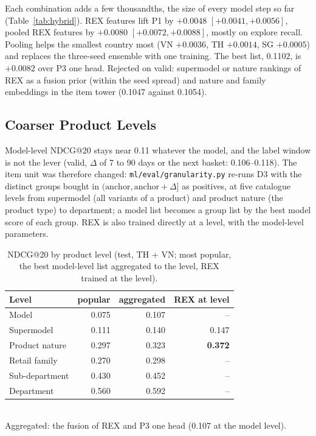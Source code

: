 \documentclass{ieeeaccess}
\begin{document}
Each combination adds a few thousandths, the size of every model step so far (Table~\ref{tab:hybrid}). REX features lift P1 by
$+0.0048$ $[+0.0041, +0.0056]$, pooled REX features by $+0.0080$ $[+0.0072, +0.0088]$, mostly on explore recall. Pooling helps the
smallest country most (VN $+0.0036$, TH $+0.0014$, SG $+0.0005$) and replaces the three-seed ensemble with one training. The best
list, 0.1102, is $+0.0082$ over P3 one head. Rejected on valid: supermodel or nature rankings of REX as a fusion prior (within the
seed spread) and nature and family embeddings in the item tower (0.1047 against 0.1054).

\subsection{Coarser Product Levels}
\label{sec:levels}
Model-level NDCG@20 stays near 0.11 whatever the model, and the label window is not the lever (valid, $\Delta$ of 7 to 90 days
or the next basket: 0.106--0.118). The item unit was therefore changed: \texttt{ml/eval/granularity.py} re-runs D3 with the
distinct groups bought in $(\text{anchor}, \text{anchor} + \Delta]$ as positives, at five catalogue levels from supermodel (all
variants of a product) and product nature (the product type) to department; a model list becomes a group list by the best model
score of each group. REX is also trained directly at a level, with the model-level parameters.

\begin{table}[t]
\caption{NDCG@20 by product level (test, TH + VN; most popular, the best model-level list aggregated to the level, REX trained at
the level).}
\label{tab:levels}
\setlength{\tabcolsep}{4pt}
\centering
\begin{tabular}{lrrr}
\toprule
Level & popular & aggregated & REX at level \\
\midrule
Model          & 0.075 & 0.107 & -- \\
Supermodel     & 0.111 & 0.140 & 0.147 \\
Product nature & 0.297 & 0.323 & \textbf{0.372} \\
Retail family  & 0.270 & 0.298 & -- \\
Sub-department & 0.430 & 0.452 & -- \\
Department     & 0.560 & 0.592 & -- \\
\bottomrule
\end{tabular}
\\[1ex]
{\footnotesize Aggregated: the fusion of REX and P3 one head (0.107 at the model level).}
\end{table}
\end{document}
